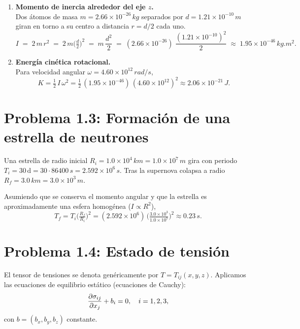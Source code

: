 \documentclass{article}
\begin{document}
\begin{enumerate}
  \item \textbf{Momento de inercia alrededor del eje $z$.}\\
    Dos átomos de masa $m = 2.66\times10^{-26}\,\si{kg}$ separados por $d = 1.21\times10^{-10}\,\si{m}$ giran en torno a su centro a distancia $r = d/2$ cada uno.  
    \[
      I \;=\; 2\,m\,r^2 
      \;=\; 2\,m\bigl(\tfrac{d}{2}\bigr)^2 
      \;=\; m\,\frac{d^2}{2}
      \;=\; (2.66\times10^{-26})\;\frac{(1.21\times10^{-10})^2}{2}
      \;\approx\;1.95\times10^{-46}\,\si{kg.m^2}.
    \]

  \item \textbf{Energía cinética rotacional.}\\
    Para velocidad angular $\omega = 4.60\times10^{12}\,\si{rad/s}$,
    \[
      K = \tfrac12\,I\,\omega^2 
      = \tfrac12\,(1.95\times10^{-46})\,(4.60\times10^{12})^2 
      \approx 2.06\times10^{-21}\,\si{J}.
    \]
\end{enumerate}

\section*{Problema 1.3: Formación de una estrella de neutrones}

Una estrella de radio inicial $R_i=1.0\times10^4\,\si{km}=1.0\times10^7\,\si{m}$ gira con periodo $T_i=30\,\mathrm{d}=30\cdot86400\,\si{s}=2.592\times10^6\,\si{s}$. Tras la supernova colapsa a radio $R_f=3.0\,\si{km}=3.0\times10^3\,\si{m}$.  

Asumiendo que se conserva el momento angular y que la estrella es aproximadamente una esfera homogénea ($I\propto R^2$),
\[
  T_f = T_i \bigl(\tfrac{R_f}{R_i}\bigr)^2
  = (2.592\times10^6)\,\bigl(\tfrac{3.0\times10^3}{1.0\times10^7}\bigr)^2
  \approx 0.23\,\si{s}.
\]


\section*{Problema 1.4: Estado de tensión}

El tensor de tensiones se denota genéricamente por \(T=T_{ij}(x,y,z)\). Aplicamos las ecuaciones de equilibrio estático (ecuaciones de Cauchy):
\[
\pdv{\sigma_{ij}}{x_j} + b_i = 0, \quad i=1,2,3,
\]
con \(b = (b_x,b_y,b_z)\) constante.
\end{document}
